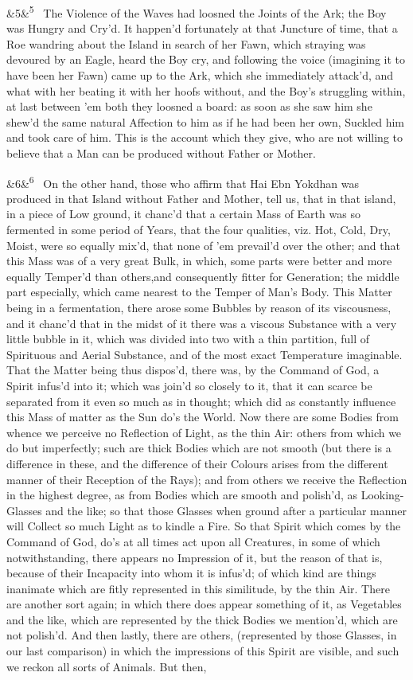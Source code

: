 \documentclass[12pt]{article}
\newcommand{\para}[1][]{\par\noindent\ifx&#1&\else\textsuperscript{\footnotesize #1}~\fi}
\begin{document}
\para[5] The Violence of the Waves had loosned the Joints of the Ark; the Boy was Hungry and Cry'd. It happen'd fortunately at that Juncture of time, that a Roe wandring about the Island in search of her Fawn, which straying was devoured by an Eagle, heard the Boy cry, and following the voice (imagining it to have been her Fawn) came up to the Ark, which she immediately attack'd, and what with her beating it with her hoofs without, and the Boy's struggling within, at last between 'em both they loosned a board: as soon as she saw him she shew'd the same natural Affection to him as if he had been her own, Suckled him and took care of him. This is the account which they give, who are not willing to believe that a Man can be produced without Father or Mother.

\para[6] On the other hand, those who affirm that Hai Ebn Yokdhan was produced in that Island without Father and Mother, tell us, that in that island, in a piece of Low ground, it chanc'd that a certain Mass of Earth was so fermented in some period of Years, that the four qualities, viz. Hot, Cold, Dry, Moist, were so equally mix'd, that none of 'em prevail'd over the other; and that this Mass was of a very great Bulk, in which, some parts were better and more equally Temper'd than others,and consequently fitter for Generation; the middle part especially, which came nearest to the Temper of Man's Body. This Matter being in a fermentation, there arose some Bubbles by reason of its viscousness, and it chanc'd that in the midst of it there was a viscous Substance with a very little bubble in it, which was divided into two with a thin partition, full of Spirituous and Aerial Substance, and of the most exact Temperature imaginable. That the Matter being thus dispos'd, there was, by the Command of God, a Spirit infus'd into it; which was join'd so closely to it, that it can scarce be separated from it even so much as in thought; which did as constantly influence this Mass of matter as the Sun do's the World. Now there are some Bodies from whence we perceive no Reflection of Light, as the thin Air: others from which we do but imperfectly; such are thick Bodies which are not smooth (but there is a difference in these, and the difference of their Colours arises from the different manner of their Reception of the Rays); and from others we receive the Reflection in the highest degree, as from Bodies which are smooth and polish'd, as Looking-Glasses and the like; so that those Glasses when ground after a particular manner will Collect so much Light as to kindle a Fire. So that Spirit which comes by the Command of God, do's at all times act upon all Creatures, in some of which notwithstanding, there appears no Impression of it, but the reason of that is, because of their Incapacity into whom it is infus'd; of which kind are things inanimate which are fitly represented in this similitude, by the thin Air. There are another sort again; in which there does appear something of it, as Vegetables and the like, which are represented by the thick Bodies we mention'd, which are not polish'd. And then lastly, there are others, (represented by those Glasses, in our last comparison) in which the impressions of this Spirit are visible, and such we reckon all sorts of Animals. But then, 
\end{document}
